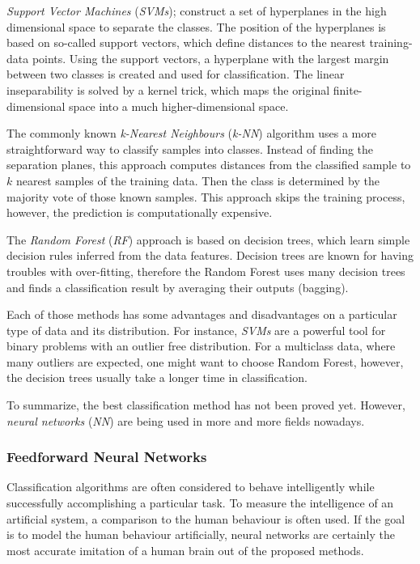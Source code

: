 \textit{Support Vector Machines} (\textit{SVMs}); \citep{article:svm} construct a set of hyperplanes in the high dimensional space to separate the classes. The position of the hyperplanes is based on so-called support vectors, which define distances to the nearest training-data points. Using the support vectors, a hyperplane with the largest margin between two classes is created and used for classification. The linear inseparability is solved by a kernel trick, which maps the original finite-dimensional space into a much higher-dimensional space.

The commonly known \textit{k-Nearest Neighbours} (\textit{k-NN}) algorithm uses a more straightforward way to classify samples into classes. Instead of finding the separation planes, this approach computes distances from the classified sample to $ k $ nearest samples of the training data. Then the class is determined by the majority vote of those known samples. This approach skips the training process, however, the prediction is computationally expensive.

The \textit{Random Forest} (\textit{RF}) approach \citep{article:rf} is based on decision trees, which learn simple decision rules inferred from the data features. Decision trees are known for having troubles with over-fitting, therefore the Random Forest uses many decision trees and finds a classification result by averaging their outputs (bagging).

Each of those methods has some advantages and disadvantages on a particular type of data and its distribution. For instance, \textit{SVMs} are a powerful tool for binary problems with an outlier free distribution. For a multiclass data, where many outliers are expected, one might want to choose Random Forest, however, the decision trees usually take a longer time in classification.

To summarize, the best classification method has not been proved yet. However, \textit{neural networks} (\textit{NN}) are being used in more and more fields nowadays.  

\subsubsection*{Feedforward Neural Networks} \label{ssec:intro_to_nn}
Classification algorithms are often considered to behave intelligently while successfully accomplishing a particular task. To measure the intelligence of an artificial system, a comparison to the human behaviour is often used. If the goal is to model the human behaviour artificially, neural networks are certainly the most accurate imitation of a human brain out of the proposed methods.


